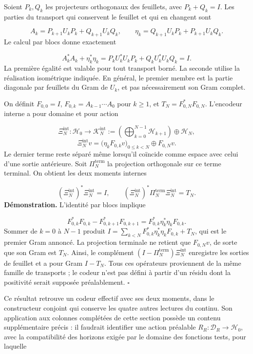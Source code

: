 Soient \(P_k,Q_k\) les projecteurs orthogonaux des feuillets, avec \(P_k+Q_k=I\). Les parties du transport qui conservent le feuillet et qui en changent sont

\[
A_k=P_{k+1}U_kP_k+Q_{k+1}U_kQ_k,
\qquad
\eta_k=Q_{k+1}U_kP_k+P_{k+1}U_kQ_k.
\]
Le calcul par blocs donne exactement

\[
A_k^*A_k+\eta_k^*\eta_k
=P_kU_k^*U_kP_k+Q_kU_k^*U_kQ_k=I.
\]
La première égalité est valable pour tout transport borné. La seconde utilise la réalisation isométrique indiquée. En général, le premier membre est la partie diagonale par feuillets du Gram de \(U_k\), et pas nécessairement son Gram complet.

On définit \(F_{0,0}=I\), \(F_{0,k}=A_{k-1}\cdots A_0\) pour \(k\geq1\), et \(T_N=F_{0,N}^*F_{0,N}\). L’encodeur interne a pour domaine et pour action

\[
\Xi_N^{\mathrm{int}}:\mathscr H_0\longrightarrow
\mathscr K_N^{\mathrm{int}}
:=\left(\bigoplus_{k=0}^{N-1}\mathscr H_{k+1}\right)\oplus\mathscr H_N,
\]
\[
\Xi_N^{\mathrm{int}}v
=\bigl(\eta_kF_{0,k}v\bigr)_{0\leq k<N}\oplus F_{0,N}v.
\]
Le dernier terme reste séparé même lorsqu’il coïncide comme espace avec celui d’une sortie antérieure. Soit \(\Pi_N^{\mathrm{term}}\) la projection orthogonale sur ce terme terminal. On obtient les deux moments internes

\[
(\Xi_N^{\mathrm{int}})^*\Xi_N^{\mathrm{int}}=I,
\qquad
(\Xi_N^{\mathrm{int}})^*\Pi_N^{\mathrm{term}}\Xi_N^{\mathrm{int}}=T_N.
\]
\textbf{Démonstration.} L'identité par blocs implique

\[
F_{0,k}^*F_{0,k}-F_{0,k+1}^*F_{0,k+1}
=F_{0,k}^*\eta_k^*\eta_kF_{0,k}.
\]
Sommer de \(k=0\) à \(N-1\) produit \(I=\sum_{k<N}F_{0,k}^*\eta_k^*\eta_kF_{0,k}+T_N\), qui est le premier Gram annoncé. La projection terminale ne retient que \(F_{0,N}v\), de sorte que son Gram est \(T_N\). Ainsi, le complément \((I-\Pi_N^{\mathrm{term}})\Xi_N^{\mathrm{int}}\) enregistre les sorties de feuillet et a pour Gram \(I-T_N\). Tous ces opérateurs proviennent de la même famille de transports ; le codeur n'est pas défini à partir d'un résidu dont la positivité serait supposée préalablement. \hfill\(\square\)

Ce résultat retrouve un codeur effectif avec ses deux moments, dans le constructeur conjoint qui conserve les quatre autres lectures du continu. Son application aux colonnes complétées de cette section possède un contenu supplémentaire précis : il faudrait identifier une action préalable \(R_R:\mathcal D_R\to\mathscr H_0\), avec la compatibilité des horizons exigée par le domaine des fonctions tests, pour laquelle

